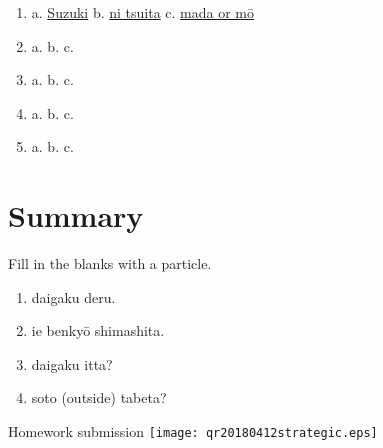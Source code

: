 \documentclass[uplatex,a4paper]{jsarticle}
\begin{document}
\begin{enumerate}
 \item a. \underline{ Suzuki\hspace{6.6zw}} b. \underline{ ni tsuita\hspace{10.8zw}} c. \underline{ mada or m\=o\hspace{10.2zw}}
 \item a. \underline{\hspace{10zw}} b. \underline{\hspace{15zw}} c. \hrulefill
 \item a. \underline{\hspace{10zw}} b. \underline{\hspace{15zw}} c. \hrulefill
 \item a. \underline{\hspace{10zw}} b. \underline{\hspace{15zw}} c. \hrulefill
 \item a. \underline{\hspace{10zw}} b. \underline{\hspace{15zw}} c. \hrulefill
\end{enumerate}


\section{Summary}

Fill in the blanks with a particle.

\begin{enumerate}
 \item daigaku \underline{\hspace{4em}} deru.
 \item ie \underline{\hspace{4em}} benky\=o shimashita.
 \item daigaku \underline{\hspace{4em}} itta?
 \item soto (outside) \underline{\hspace{4em}} tabeta?
\end{enumerate}

\ifQR
\vspace*{-6\baselineskip}
\begin{flushright}
Homework submission \texttt{[image: qr20180412strategic.eps]}
\end{flushright}
\fi%
\end{document}
